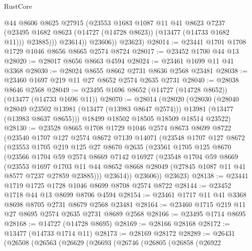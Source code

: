 \begin{lexlean}{RustCore}
\begin{coremodule}
                  @44
                  @8606
                  @8625
                  @27915
                  (@23553
                    @1683
                    @1087
                    @11
                    @41
                    @8623
                    @7237
                    (@23495 @1682 @8623 (@14727 (@14728 @8623)) (@13477 (@14733 @1682 @11)))
                    @23885)))
              @23614))
          @23606))
      @23623)
@28014 := @23441 @1701 @1708 @1729 @1046 @8656 @8665 @2574 @8724
@28017 := @23452 @1700 @44 @13
@28020 := @28017 @8656 @8663 @4594
@28024 := @23461 @1699 @11 @41 @3368
@28030 := @28024 @8655 @8662 @2731 @8636 @2568 @23481
@28038 := @23460 @1697 @219 @11 @27 @8652 @2574 @2635 @2731
@28040 := @28038 @8646 @2568
@28049 := @23495 @1696 @8652 (@14727 (@14728 @8652)) (@13477 (@14733 @1696 @11))
@28070 := @28014
    (@28020
      (@28030
        (@28040 @28049 @23502 @13981 (@13477 (@13983 @8647 @2574)))
        @13981
        (@13477 (@13983 @8637 @8655)))
      @18499
      @18502
      @18505
      @18509
      @18514
      @23522)
@28130 := @23528
    @8665
    @1708
    @1729
    @1046
    @2574
    @8673
    @8699
    @8722
    (@23540
      @1707
      @127
      @2574
      @8672
      @7139
      @14071
      (@23548
        @1707
        @127
        @8672
        (@23553
          @1705
          @219
          @125
          @27
          @8670
          @2635
          (@23561
            @1705
            @125
            @8670
            (@23566
              @1704
              @59
              @2574
              @8669
              @7142
              @16927
              (@23548
                @1704
                @59
                @8669
                (@23553
                  @1697
                  @1703
                  @11
                  @44
                  @8652
                  @8668
                  @28049
                  (@27845 @1087 @11 @41 @8577 @7237 @27859 @23885)))
              @23614))
          @23606))
      @23623)
@28138 := @23441 @1719 @1725 @1728 @1046 @8699 @8708 @2574 @8722
@28144 := @23452 @1718 @44 @13 @8699 @8706 @4594
@28154 := @23461 @1717 @11 @41 @3368 @8698 @8705 @2731 @8679 @2568 @23481
@28164 := @23460 @1715 @219 @11 @27 @8695 @2574 @2635 @2731 @8689 @2568
@28166 := @23495 @1714 @8695
@28168 := @14727 (@14728 @8695)
@28169 := @28166 @28168
@28172 := @13477 (@14733 @1714 @11)
@28173 := @28169 @28172
@28289 := @26431
    (@26508
      (@26563
        (@26629
          (@26693
            (@26746
              (@26805
                (@26858
                  (@26922

\end{coremodule}
\end{lexlean}
